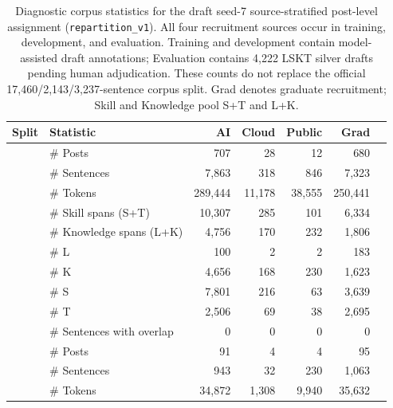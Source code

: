 \begin{table}[t]
\centering
\caption{Diagnostic corpus statistics for the draft seed-7 source-stratified post-level assignment (\texttt{repartition\_v1}). All four recruitment sources occur in training, development, and evaluation. Training and development contain model-assisted draft annotations; Evaluation contains 4,222 LSKT silver drafts pending human adjudication. These counts do not replace the official 17,460/2,143/3,237-sentence corpus split. Grad denotes graduate recruitment; Skill and Knowledge pool S+T and L+K.}
\label{tab:dataset-stats}
\scriptsize
\setlength{\tabcolsep}{3.5pt}
\renewcommand{\arraystretch}{0.94}
\begin{tabular}{ll rrrr | r}
\toprule
\textbf{Split} & \textbf{Statistic} & \textbf{AI} & \textbf{Cloud} & \textbf{Public} & \textbf{Grad} &  \\
\midrule
{} & \# Posts & 707 & 28 & 12 & 680 &  \\
 & \# Sentences & 7,863 & 318 & 846 & 7,323 &  \\
 & \# Tokens & 289,444 & 11,178 & 38,555 & 250,441 &  \\
 & \# Skill spans (S+T) & 10,307 & 285 & 101 & 6,334 &  \\
 & \# Knowledge spans (L+K) & 4,756 & 170 & 232 & 1,806 &  \\
 & \# L & 100 & 2 & 2 & 183 &  \\
 & \# K & 4,656 & 168 & 230 & 1,623 &  \\
 & \# S & 7,801 & 216 & 63 & 3,639 &  \\
 & \# T & 2,506 & 69 & 38 & 2,695 &  \\
 & \# Sentences with overlap & 0 & 0 & 0 & 0 &  \\
\midrule
{} & \# Posts & 91 & 4 & 4 & 95 &  \\
 & \# Sentences & 943 & 32 & 230 & 1,063 &  \\
 & \# Tokens & 34,872 & 1,308 & 9,940 & 35,632 &  \\

\end{tabular}
\end{table}
